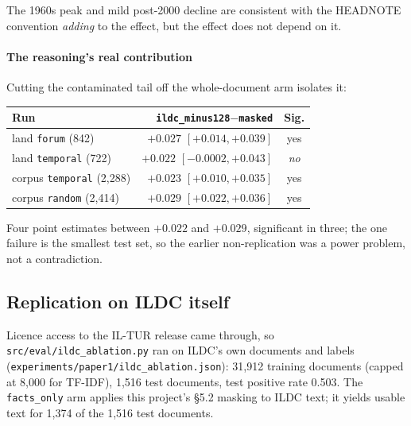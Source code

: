 \documentclass[12pt,a4paper]{article}
\newcommand{\code}[1]{\texttt{\small #1}}
\begin{document}
The 1960s peak and mild post-2000 decline are consistent with the HEADNOTE convention \emph{adding}
to the effect, but the effect does not depend on it.

\paragraph{The reasoning's real contribution} Cutting the contaminated tail off the whole-document
arm isolates it:

\begin{center}
\begin{tabular}{@{}lrc@{}}
\toprule
\textbf{Run} & \code{ildc\_minus128}$-$\code{masked} & \textbf{Sig.} \\
\midrule
land \code{forum} (842) & $+0.027$ $[+0.014, +0.039]$ & yes \\
land \code{temporal} (722) & $+0.022$ $[-0.0002, +0.043]$ & \emph{no} \\
corpus \code{temporal} (2,288) & $+0.023$ $[+0.010, +0.035]$ & yes \\
corpus \code{random} (2,414) & $+0.029$ $[+0.022, +0.036]$ & yes \\
\bottomrule
\end{tabular}
\end{center}

Four point estimates between $+0.022$ and $+0.029$, significant in three; the one failure is the
smallest test set, so the earlier non-replication was a power problem, not a contradiction.

\subsection{Replication on ILDC itself}\label{sec:ildc}

Licence access to the IL-TUR release came through, so \code{src/eval/ildc\_ablation.py} ran on
ILDC's own documents and labels (\code{experiments/paper1/ildc\_ablation.json}): 31,912 training
documents (capped at 8,000 for TF-IDF), 1,516 test documents, test positive rate 0.503. The
\code{facts\_only} arm applies this project's §5.2 masking to ILDC text; it yields usable text for
1,374 of the 1,516 test documents.
\end{document}
